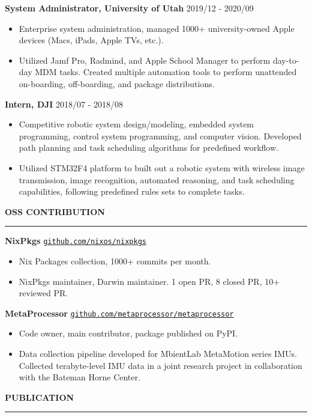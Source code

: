 \documentclass{letter}
\newcommand{\link}[2]{
\href{#1}{\underline{\texttt{#2}}}
}
\newcommand{\section}[1]{
\Large{\textbf{\MakeUppercase{#1}}}

\vspace{-0.3in}
\rule{\textwidth}{0.25mm}
\vspace{-0.35in}
}
\newcommand{\experience}[3]{
\large{\textbf{#1} \hfill \normalsize{#2}}

\vspace{-2.5mm}

\normalsize{#3}

\vspace{-2.5mm}
}
\begin{document}
\experience{System Administrator, University of Utah}{2019/12 - 2020/09} {
\begin{itemize}
\item Enterprise system administration, managed 1000+ university-owned Apple devices (Macs, iPads, Apple TVs, etc.).
\item Utilized Jamf Pro, Radmind, and Apple School Manager to perform day-to-day MDM tasks. Created multiple automation tools to perform unattended on-boarding, off-boarding, and package distributions.
\end{itemize}
}

\experience{Intern, DJI}{2018/07 - 2018/08} {
\begin{itemize}
\item Competitive robotic system design/modeling, embedded system programming, control system programming, and computer vision. Developed path planning and task scheduling algorithms for predefined workflow.
\item Utilized STM32F4 platform to built out a robotic system with wireless image transmission, image recognition, automated reasoning, and task scheduling capabilities, following predefined rules sets to complete tasks.
\end{itemize}
}

\section{OSS Contribution}

\experience{NixPkgs}
{\link{https://github.com/nixos/nixpkgs}{github.com/nixos/nixpkgs}} {
\begin{itemize}
\item Nix Packages collection, 1000+ commits per month.
\item NixPkgs maintainer, Darwin maintainer. 1 open PR, 8 closed PR, 10+ reviewed PR.
\end{itemize}
}

\experience{MetaProcessor}
{\link{https://github.com/metaprocessor/metaprocessor}{github.com/metaprocessor/metaprocessor}} {
\begin{itemize}
\item Code owner, main contributor, package published on PyPI.
\item Data collection pipeline developed for MbientLab MetaMotion series IMUs. Collected terabyte-level IMU data in a joint research project in collaboration with the Bateman Horne Center. 
\end{itemize}
}

\section{Publication}

\normalsize{
\nocite{*}


}
\end{document}
